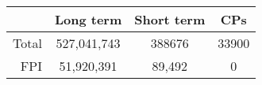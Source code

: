 \begin{table}[ht]
\centering
\begin{tabular}{rccc}
  \hline
  & Long term & Short term & CPs  \\  
  \hline
  Total & 527,041,743 & 388676 & 33900 \\    
  FPI & 51,920,391 & 89,492 & 0 \\
  \hline
\end{tabular}
\end{table}
